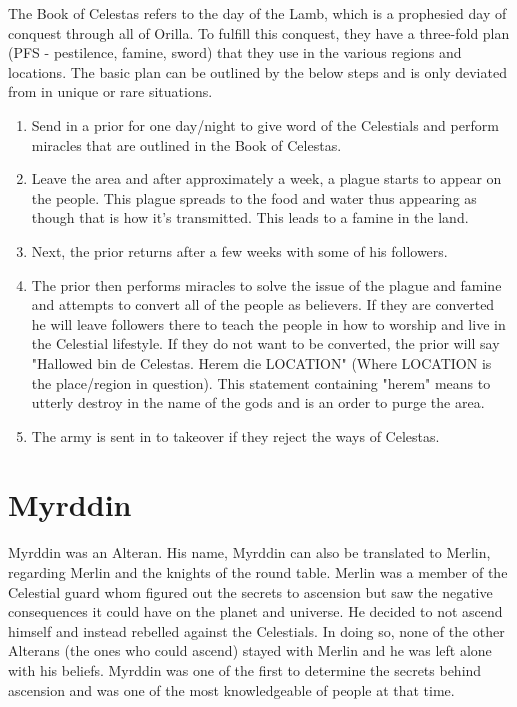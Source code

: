 The Book of Celestas refers to the day of the Lamb, which is a prophesied day of conquest through all of Orilla. To fulfill this conquest, they have a three-fold plan (PFS - pestilence, famine, sword) that they use in the various regions and locations. The basic plan can be outlined by the below steps and is only deviated from in unique or rare situations.
\begin{enumerate}
	\item Send in a prior for one day/night to give word of the Celestials and perform miracles that are outlined in the Book of Celestas.
	\item Leave the area and after approximately a week, a plague starts to appear on the people. This plague spreads to the food and water thus appearing as though that is how it's transmitted. This leads to a famine in the land.
	\item Next, the prior returns after a few weeks with some of his followers.
	\item The prior then performs miracles to solve the issue of the plague and famine and attempts to convert all of the people as believers. If they are converted he will leave followers there to teach the people in how to worship and live in the Celestial lifestyle. If they do not want to be converted, the prior will say "Hallowed bin de Celestas. Herem die LOCATION" (Where LOCATION is the place/region in question). This statement containing "herem" means to utterly destroy in the name of the gods and is an order to purge the area.
	\item The army is sent in to takeover if they reject the ways of Celestas.
\end{enumerate}

\section{Myrddin}

Myrddin was an Alteran. His name, Myrddin can also be translated to Merlin, regarding Merlin and the knights of the round table. Merlin was a member of the Celestial guard whom figured out the secrets to ascension but saw the negative consequences it could have on the planet and universe. He decided to not ascend himself and instead rebelled against the Celestials. In doing so, none of the other Alterans (the ones who could ascend) stayed with Merlin and he was left alone with his beliefs. Myrddin was one of the first to determine the secrets behind ascension and was one of the most knowledgeable of people at that time.

